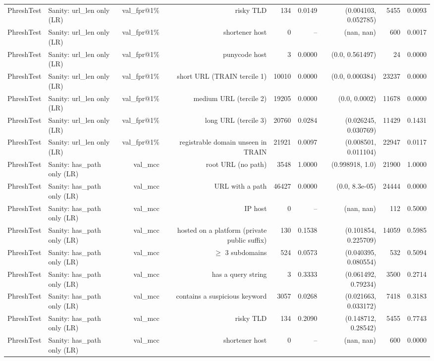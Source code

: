 \begin{table}[t]
\begin{tabular}{llrrrrrrr}
PhreshTest & Sanity: url\_len only (LR) & val\_fpr@1\% & risky TLD & 134 & 0.0149 & (0.004103, 0.052785) & 5455 & 0.0093 \\
PhreshTest & Sanity: url\_len only (LR) & val\_fpr@1\% & shortener host & 0 & -- & (nan, nan) & 600 & 0.0017 \\
PhreshTest & Sanity: url\_len only (LR) & val\_fpr@1\% & punycode host & 3 & 0.0000 & (0.0, 0.561497) & 24 & 0.0000 \\
PhreshTest & Sanity: url\_len only (LR) & val\_fpr@1\% & short URL (TRAIN tercile 1) & 10010 & 0.0000 & (0.0, 0.000384) & 23237 & 0.0000 \\
PhreshTest & Sanity: url\_len only (LR) & val\_fpr@1\% & medium URL (tercile 2) & 19205 & 0.0000 & (0.0, 0.0002) & 11678 & 0.0000 \\
PhreshTest & Sanity: url\_len only (LR) & val\_fpr@1\% & long URL (tercile 3) & 20760 & 0.0284 & (0.026245, 0.030769) & 11429 & 0.1431 \\
PhreshTest & Sanity: url\_len only (LR) & val\_fpr@1\% & registrable domain unseen in TRAIN & 21921 & 0.0097 & (0.008501, 0.011104) & 22947 & 0.0117 \\
PhreshTest & Sanity: has\_path only (LR) & val\_mcc & root URL (no path) & 3548 & 1.0000 & (0.998918, 1.0) & 21900 & 1.0000 \\
PhreshTest & Sanity: has\_path only (LR) & val\_mcc & URL with a path & 46427 & 0.0000 & (0.0, 8.3e-05) & 24444 & 0.0000 \\
PhreshTest & Sanity: has\_path only (LR) & val\_mcc & IP host & 0 & -- & (nan, nan) & 112 & 0.5000 \\
PhreshTest & Sanity: has\_path only (LR) & val\_mcc & hosted on a platform (private public suffix) & 130 & 0.1538 & (0.101854, 0.225709) & 14059 & 0.5985 \\
PhreshTest & Sanity: has\_path only (LR) & val\_mcc & $\geq$ 3 subdomains & 524 & 0.0573 & (0.040395, 0.080554) & 532 & 0.5094 \\
PhreshTest & Sanity: has\_path only (LR) & val\_mcc & has a query string & 3 & 0.3333 & (0.061492, 0.79234) & 3500 & 0.2714 \\
PhreshTest & Sanity: has\_path only (LR) & val\_mcc & contains a suspicious keyword & 3057 & 0.0268 & (0.021663, 0.033172) & 7418 & 0.3183 \\
PhreshTest & Sanity: has\_path only (LR) & val\_mcc & risky TLD & 134 & 0.2090 & (0.148712, 0.28542) & 5455 & 0.7743 \\
PhreshTest & Sanity: has\_path only (LR) & val\_mcc & shortener host & 0 & -- & (nan, nan) & 600 & 0.0000 \\

\end{tabular}
\end{table}
